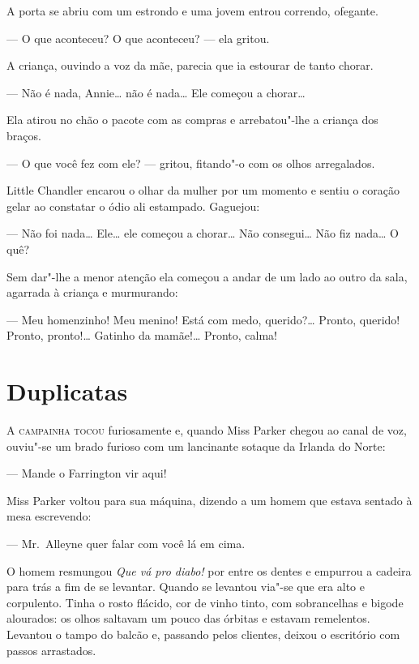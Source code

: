 A porta se abriu com um estrondo e uma jovem entrou correndo, ofegante.

--- O que aconteceu? O que aconteceu? --- ela gritou.

A criança, ouvindo a voz da mãe, parecia que ia estourar de tanto chorar.

--- Não é nada, Annie\ldots{} não é nada\ldots{} Ele começou a chorar\ldots{}

Ela atirou no chão o pacote com as compras e arrebatou"-lhe a criança dos
braços.

--- O que você fez com ele? --- gritou, fitando"-o com os olhos arregalados.

Little Chandler encarou o olhar da mulher por um momento e sentiu o coração
gelar ao constatar o ódio ali estampado.  Gaguejou:

--- Não foi nada\ldots{} Ele\ldots{} ele começou a chorar\ldots{} Não
consegui\ldots{} Não fiz nada\ldots{} O quê?

Sem dar"-lhe a menor atenção ela começou a andar de um lado ao outro da sala,
agarrada à criança e murmurando:

--- Meu homenzinho!  Meu menino!  Está com medo, querido?\ldots{} Pronto,
querido!  Pronto, pronto!\ldots{} Gatinho da mamãe!\ldots{} Pronto, calma!



\chapter{Duplicatas}

\textsc{A campainha tocou} furiosamente e, quando Miss Parker chegou ao canal
de voz, ouviu"-se um brado furioso com um lancinante sotaque da Irlanda do
Norte:

--- Mande o Farrington vir aqui!

Miss Parker voltou para sua máquina, dizendo a um homem que estava sentado à
mesa escrevendo:

--- Mr.~Alleyne quer falar com você lá em cima.

O homem resmungou \textit{Que vá pro diabo!} por entre os dentes e empurrou a
cadeira para trás a fim de se levantar.  Quando se levantou via"-se que era alto
e corpulento.  Tinha o rosto flácido, cor de vinho tinto, com sobrancelhas e
bigode alourados: os olhos saltavam um pouco das órbitas e estavam remelentos.
Levantou o tampo do balcão e, passando pelos clientes, deixou o escritório com
passos arrastados.

